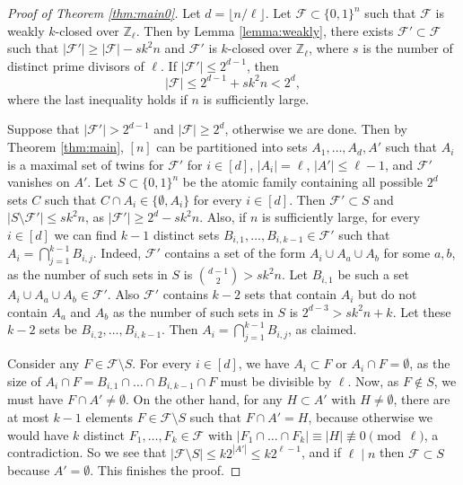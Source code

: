	\begin{proof}[Proof of Theorem \ref{thm:main0}]
		Let $d=\lfloor n/\ell\rfloor$. Let $\mathcal{F}\subset\{0,1\}^{n}$ such that $\mathcal{F}$ is weakly $k$-closed over $\mathbb{Z}_{\ell}$. Then by Lemma \ref{lemma:weakly}, there exists $\mathcal{F}'\subset \mathcal{F}$ such that $|\mathcal{F}'|\geq |\mathcal{F}|-sk^2n$ and $\mathcal{F}'$ is $k$-closed over $\mathbb{Z}_{\ell}$, where $s$ is the number of distinct prime divisors of $\ell$. If $|\mathcal{F}'|\leq 2^{d-1}$, then 
		$$|\mathcal{F}|\leq 2^{d-1}+sk^2n<2^{d},$$
		where the last inequality holds if $n$ is sufficiently large. 
		
		Suppose that $|\mathcal{F}'|> 2^{d-1}$ and $|\mathcal{F}|\geq 2^{d}$, otherwise we are done. Then by Theorem \ref{thm:main}, $[n]$ can be partitioned into sets $A_{1},\dots,A_{d},A'$ such that $A_{i}$ is a maximal set of twins for $\mathcal{F}'$ for $i\in [d]$, $|A_{i}|=\ell$, $|A'|\leq \ell-1$, and $\mathcal{F}'$ vanishes on $A'$. Let $S\subset \{0,1\}^{n}$ be the atomic family containing all possible $2^{d}$ sets $C$ such that $C\cap A_{i}\in \{\emptyset,A_{i}\}$ for every $i\in [d]$. Then $\mathcal{F}'\subset S$ and $|S\setminus\mathcal{F}'|\leq sk^2n$, as $|\mathcal{F}'| \geq 2^d - sk^2n$. Also, if $n$ is sufficiently large, for every $i\in [d]$ we can find $k-1$ distinct sets $B_{i,1},\dots,B_{i,k-1}\in \mathcal{F}'$ such that $A_i=\bigcap_{j=1}^{k-1}B_{i,j}$. Indeed, $\mathcal{F}'$ contains a set of the form $A_{i}\cup A_{a}\cup A_{b}$ for some $a,b$, as the number of such sets in $S$ is $\binom{d-1}{2}>sk^2n$. Let $B_{i,1}$ be such a set $A_{i}\cup A_{a}\cup A_{b} \in \mathcal{F}'$. Also $\mathcal{F}'$ contains $k-2$ sets that contain $A_i$ but do not contain $A_{a}$ and $A_b$ as the number of such sets in $S$ is $2^{d-3}> sk^2n+k$. Let these $k-2$ sets be $B_{i,2},\dots,B_{i,k-1}$. Then $A_{i}=\bigcap_{j=1}^{k-1}B_{i,j}$, as claimed. 
		
		Consider any $F\in \mathcal{F}\setminus S$.
		For every $i\in [d]$, we have $A_i\subset F$ or $A_i\cap F=\emptyset$, as the size of  $A_i\cap F=B_{i,1}\cap\dots\cap B_{i,k-1}\cap F$ must be divisible by $\ell$. 
		Now, as $F \notin S$, we must have 
		$F \cap A' \neq \emptyset$.
		On the other hand, for any $H\subset A'$ with $H\neq \emptyset$, there are at most $k-1$ elements $F\in\mathcal{F}\setminus S$ such that $F\cap A'=H$, because otherwise we would have $k$ distinct $F_1,\dots,F_k \in \mathcal{F}$ with $|F_1 \cap \dots \cap F_k| \equiv |H| \not\equiv 0 \pmod{\ell}$, a contradiction. 
		So we see that $|\mathcal{F}\setminus S|\leq k2^{|A'|}\leq k2^{\ell-1}$, and if $\ell \mid n$ then $\mathcal{F}\subset S$ because $A' = \emptyset$. This finishes the proof.
	\end{proof}
